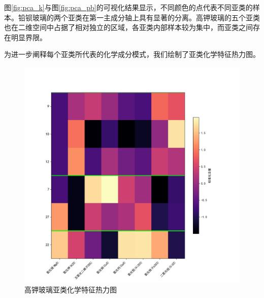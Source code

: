 图\ref{fig:pca_k}与图\ref{fig:pca_pb}的可视化结果显示，不同颜色的点代表不同亚类的样本。铅钡玻璃的两个亚类在第一主成分轴上具有显著的分离。高钾玻璃的五个亚类也在二维空间中占据了相对独立的区域，各亚类内部样本较为集中，而亚类之间存在明显界限。

为进一步阐释每个亚类所代表的化学成分模式，我们绘制了亚类化学特征热力图。

\begin{figure}[H]
    \centering
    \begin{minipage}{0.48\textwidth}
        \centering
        \includegraphics[width=\linewidth]{figs/4问题二/高钾玻璃_亚类热力图_带编号.png}
        \caption{高钾玻璃亚类化学特征热力图}
        \label{fig:heatmap_k}
    \end{minipage}\hfill
    \begin{minipage}{0.48\textwidth}
        \centering

\end{minipage}
\end{figure}
